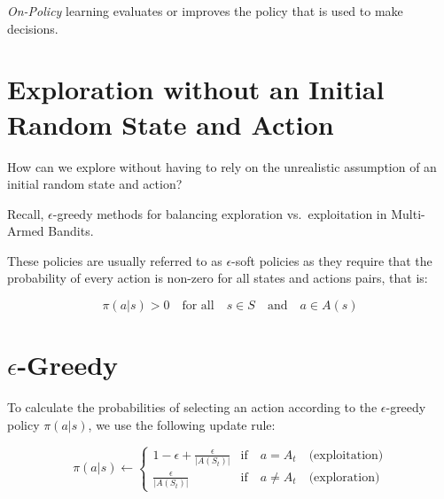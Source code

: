 \documentclass[
  letterpaper,
  DIV=11,
  numbers=noendperiod]{scrreprt}
\begin{document}
\begin{tcolorbox}[enhanced jigsaw, opacityback=0, left=2mm, breakable, bottomtitle=1mm, rightrule=.15mm, colframe=quarto-callout-tip-color-frame, titlerule=0mm, colback=white, opacitybacktitle=0.6, toptitle=1mm, title=\textcolor{quarto-callout-tip-color}{\faLightbulb}\hspace{0.5em}{On-Policy Learning}, colbacktitle=quarto-callout-tip-color!10!white, bottomrule=.15mm, arc=.35mm, coltitle=black, leftrule=.75mm, toprule=.15mm]

\emph{On-Policy} learning evaluates or improves the policy that is used
to make decisions.

\end{tcolorbox}

\section{Exploration without an Initial Random State and
Action}\label{exploration-without-an-initial-random-state-and-action}

How can we explore without having to rely on the unrealistic assumption
of an initial random state and action?

Recall, \(\epsilon\)-greedy methods for balancing exploration
vs.~exploitation in Multi-Armed Bandits.

These policies are usually referred to as \(\epsilon\)-soft policies as
they require that the probability of every action is non-zero for all
states and actions pairs, that is:

\[
\pi(a|s) > 0 \quad \text{for all} \quad s \in S \quad \text{and} \quad a \in A(s)
\]

\section{\texorpdfstring{\(\epsilon\)-Greedy}{\textbackslash epsilon-Greedy}}\label{epsilon-greedy}

To calculate the probabilities of selecting an action according to the
\(\epsilon\)-greedy policy \(\pi(a|s)\), we use the following update
rule:

\[
\pi(a|s) \gets \begin{cases}
1 - \epsilon + \frac{\epsilon}{|A(S_{t})|}  & \text{if} \quad a = A_{t} \quad \text{(exploitation)} \\
\frac{\epsilon}{|A(S_{t})|} & \text{if} \quad a \neq A_{t} \quad \text{(exploration)}
\end{cases}
\]
\end{document}
